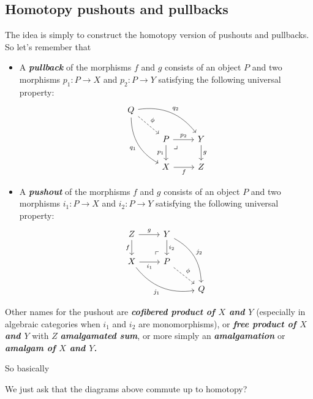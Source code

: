 \subsection*{Homotopy pushouts and pullbacks}
The idea is simply to construct the homotopy version of pushouts and pullbacks. So let's remember that
\begin{defn}\leavevmode 
	\begin{itemize}
		\item A \textbf{\textit{pullback}} of the morphisms $f$ and $g$ consists of an object $P$ and two morphisms $p_1:P\to X$ and $p_2:P\to Y$ satisfying the following universal property:
		\[\begin{tikzcd}
			Q\arrow[rrd,bend left,"q_2"]\arrow[ddr,"q_1",swap,bend right]\arrow[dr,dashed,"\phi"]\\
			&P\arrow[r,"p_2"] \arrow[rd, phantom, "\lrcorner", very near start]\arrow[d,"p_1",swap]&Y\arrow[d,"g"]\\
			&X\arrow[r,"f",swap]&Z
		\end{tikzcd}\]
		\item A \textbf{\textit{pushout}} of the morphisms $f$ and $g$ consists of an object $P$ and two morphisms $i_1:P\to X$ and $i_2:P\to Y$ satisfying the following universal property:
		\[\begin{tikzcd}
			Z\arrow[r,"g"]\arrow[d,swap,"f"]&Y\arrow[d,"i_2"]\arrow[ddr,bend left,"j_2"]\\
			X\arrow[r,"i_1",swap]\arrow[drr,bend right,swap,"j_1"]&P\arrow[ul, phantom, "\ulcorner", very near start]\arrow[dr,dashed,"\phi"]\\
			&&Q
		\end{tikzcd}\]
	\end{itemize}
		\begin{remark}
			Other names for the pushout are \textbf{\textit{cofibered product of $X$ and $Y$}} (especially in algebraic categories when $i_1$ and $i_2$ are monomorphisms), or \textbf{\textit{free product of $X$ and $Y$}} with $Z$ \textbf{\textit{amalgamated sum}}, or more simply an \textbf{\textit{amalgamation}} or \textbf{\textit{amalgam of $X$ and $Y$.}}
		\end{remark}
	\end{defn}
		So basically
\begin{defn}
	{\color{magenta}We just ask that the diagrams above commute up to homotopy?}
\end{defn}

